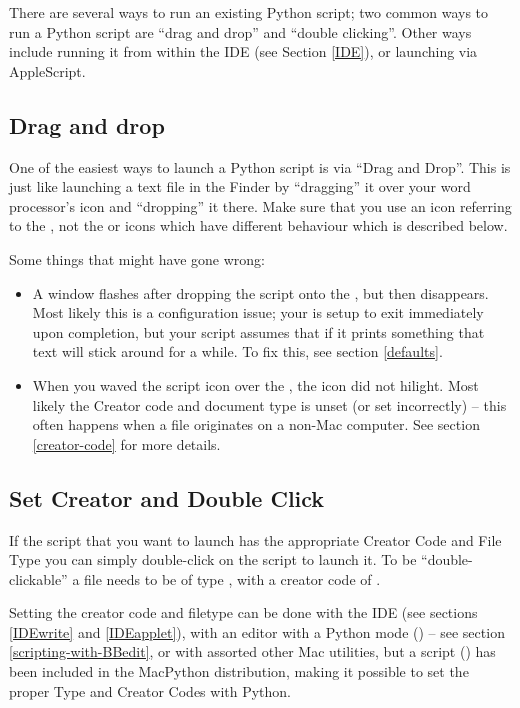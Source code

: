 There are several ways to run an existing Python script; two common
ways to run a Python script are ``drag and drop'' and ``double
clicking''.  Other ways include running it from within the IDE (see
Section \ref{IDE}), or launching via AppleScript.


\subsection{Drag and drop}

One of the easiest ways to launch a Python script is via ``Drag and
Drop''. This is just like launching a text file in the Finder by
``dragging'' it over your word processor's icon and ``dropping'' it
there. Make sure that you use an icon referring to the
, not the  or 
icons which have different behaviour which is described below.

Some things that might have gone wrong:

\begin{itemize}
\item
A window flashes after dropping the script onto the
, but then disappears. Most likely this is a
configuration issue; your  is setup to exit
immediately upon completion, but your script assumes that if it prints
something that text will stick around for a while. To fix this, see
section \ref{defaults}.

\item
When you waved the script icon over the ,
the  icon did not hilight.  Most likely the
Creator code and document type is unset (or set incorrectly) -- this
often happens when a file originates on a non-Mac computer.  See
section \ref{creator-code} for more details.
\end{itemize}


\subsection{Set Creator and Double Click \label{creator-code}}

If the script that you want to launch has the appropriate Creator Code
and File Type you can simply double-click on the script to launch it.
To be ``double-clickable'' a file needs to be of type ,
with a creator code of .

Setting the creator code and filetype can be done with the IDE (see
sections \ref{IDEwrite} and \ref{IDEapplet}), with an editor with a
Python mode () -- see section
\ref{scripting-with-BBedit}, or with assorted other Mac utilities, but
a script () has been included in the MacPython
distribution, making it possible to set the proper Type and Creator
Codes with Python.

